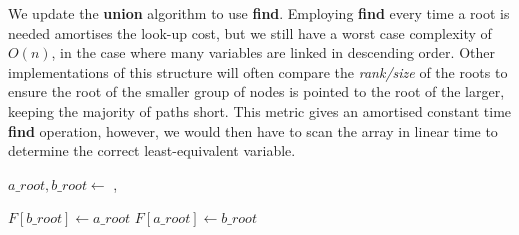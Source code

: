 \documentclass[11pt,table]{article}
\newcounter{r}
\begin{document}
We update the \textbf{union} algorithm to use \textbf{find}. Employing \textbf{find} every time a root is needed amortises the look-up cost, but we still have a worst case complexity of $ O(n) $, in the case where many variables are linked in descending order. Other implementations of this structure will often compare the \textit{rank/size} of the roots to ensure the root of the smaller group of nodes is pointed to the root of the larger, keeping the majority of paths short. This metric gives an amortised constant time \textbf{find} operation, however, we would then have to scan the array in linear time to determine the correct least-equivalent variable.

\begin{algorithm}
	\begin{algorithmic}[1]
		\State $ a\_root, b\_root \gets $ , 
		
			\State $ F[b\_root] \gets a\_root $
			\State $ F[a\_root] \gets b\_root $
		\EndIf
		
		\EndFunction
	\end{algorithmic}
\end{algorithm}
\end{document}
